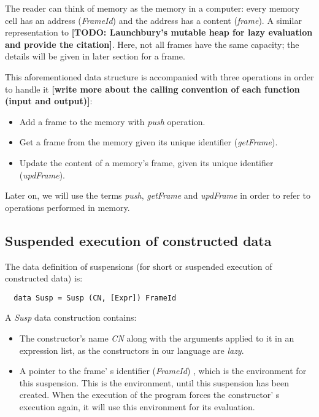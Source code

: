 \documentclass[diploma]{softlab-thesis}
\begin{document}
The reader can think of memory as the memory in a computer: every memory cell has an address (\textit{FrameId}) and 
the address has a content (\textit{frame}). A similar representation to \textbf{[TODO: Launchbury's mutable heap for 
lazy evaluation and provide the citation]}.
Here, not all frames have the same capacity; the details will be given in later section for a frame.
\newline
\par This aforementioned data structure is accompanied with three operations in order to handle it \textbf{[write 
more about the calling convention of each function (input and output)]}:
\begin{itemize}
  \item Add a frame to the memory with \textit{push} operation.
  \item Get a frame from the memory given its unique identifier (\textit{getFrame}).
  \item Update the content of a memory's frame, given its unique identifier (\textit{updFrame}).
\end{itemize}

Later on, we will use the terms \textit{push}, \textit{getFrame} and \textit{updFrame} in order to refer to 
operations performed in memory.

\subsection{Suspended execution of constructed data}

The data definition of suspensions (for short or suspended execution of constructed data) is:
\begin{verbatim}
  data Susp = Susp (CN, [Expr]) FrameId
\end{verbatim}

A \textit{Susp} data construction contains:
\begin{itemize}
  \item The constructor's name \textit{CN} along with the arguments applied to it in an expression list, 
  as the constructors in our language are \textit{lazy}.
  \item A pointer to the frame' s identifier (\textit{FrameId}) , which is the environment for this suspension.
  This is the environment, until this suspension has been created. When the execution of the program forces the 
  constructor' s execution again, it will use this environment for its evaluation.
\end{itemize}
\end{document}

